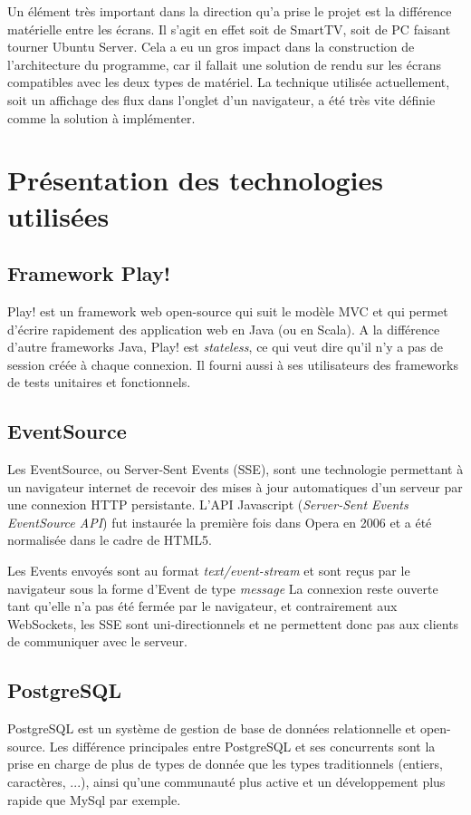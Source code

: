 \documentclass[french]{article}
\begin{document}
Un élément très important dans la direction qu'a prise le projet est la différence matérielle entre les écrans. Il s'agit en effet soit de SmartTV, soit de PC faisant tourner Ubuntu Server. Cela a eu un gros impact dans la construction de l'architecture du programme, car il fallait une solution de rendu sur les écrans compatibles avec les deux types de matériel. La technique utilisée actuellement, soit un affichage des flux dans l'onglet d'un navigateur, a été très vite définie comme la solution à implémenter.


\newpage
\section{Présentation des technologies utilisées}

\subsection{Framework Play!}
Play! est un framework web open-source qui suit le modèle MVC et qui permet d'écrire rapidement des application web en Java (ou en Scala). A la différence d'autre frameworks Java, Play! est \textit{stateless}, ce qui veut dire qu'il n'y a pas de session créée à chaque connexion. 
Il fourni aussi à ses utilisateurs des frameworks de tests unitaires et fonctionnels.


\subsection{EventSource}
Les EventSource, ou Server-Sent Events (SSE), sont une technologie permettant à un navigateur internet de recevoir des mises à jour automatiques d'un serveur par une connexion HTTP persistante. L'API Javascript (\textit{Server-Sent Events EventSource API}) fut instaurée la première fois dans Opera en 2006 et a été normalisée dans le cadre de HTML5. \par
Les Events envoyés sont au format \textit{text/event-stream} et sont reçus par le navigateur sous la forme d'Event de type \textit{message} La connexion reste ouverte tant qu'elle n'a pas été fermée par le navigateur, et contrairement aux WebSockets, les SSE sont uni-directionnels et ne permettent donc pas aux clients de communiquer avec le serveur. 

\subsection{PostgreSQL}
PostgreSQL est un système de gestion de base de données relationnelle et open-source. Les différence principales entre PostgreSQL et ses concurrents sont la prise en charge de plus de types de donnée que les types traditionnels (entiers, caractères, ...), ainsi qu'une communauté plus active et un développement plus rapide que MySql par exemple.
\end{document}

